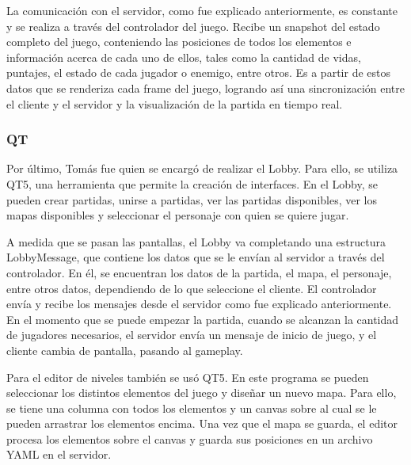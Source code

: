 \documentclass[titlepage,a4paper]{article}
\newcounter{subsubsubsection}[subsubsection]
\begin{document}
La comunicación con el servidor, como fue explicado anteriormente, es constante y se realiza a través del controlador del juego. Recibe un snapshot del estado completo del juego, conteniendo las posiciones de todos los elementos e información acerca de cada uno de ellos, tales como la cantidad de vidas, puntajes, el estado de cada jugador o enemigo, entre otros. Es a partir de estos datos que se renderiza cada frame del juego, logrando así una sincronización entre el cliente y el servidor y la visualización de la partida en tiempo real.

\subsubsection{QT}

Por último, Tomás fue quien se encargó de realizar el Lobby. Para ello, se utiliza QT5, una herramienta que permite la creación de interfaces. En el Lobby, se pueden crear partidas, unirse a partidas, ver las partidas disponibles, ver los mapas disponibles y seleccionar el personaje con quien se quiere jugar.

A medida que se pasan las pantallas, el Lobby va completando una estructura LobbyMessage, que contiene los datos que se le envían al servidor a través del controlador. En él, se encuentran los datos de la partida, el mapa, el personaje, entre otros datos, dependiendo de lo que seleccione el cliente. El controlador envía y recibe los mensajes desde el servidor como fue explicado anteriormente. En el momento que se puede empezar la partida, cuando se alcanzan la cantidad de jugadores necesarios, el servidor envía un mensaje de inicio de juego, y el cliente cambia de pantalla, pasando al gameplay.

Para el editor de niveles también se usó QT5. En este programa se pueden seleccionar los distintos elementos del juego y diseñar un nuevo mapa. Para ello, se tiene una columna con todos los elementos y un canvas sobre al cual se le pueden arrastrar los elementos encima. Una vez que el mapa se guarda, el editor procesa los elementos sobre el canvas y guarda sus posiciones en un archivo YAML en el servidor. 
\end{document}
